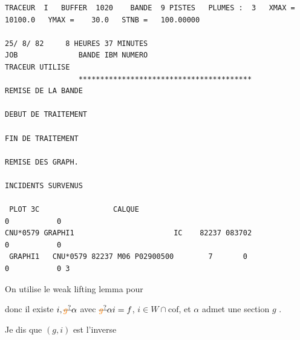 
{\fontsize{4}{5}\selectfont
\begin{verbatim}
TRACEUR  I   BUFFER  1020    BANDE  9 PISTES   PLUMES :  3   XMAX =    10100.0   YMAX =    30.0   STNB =   100.00000
                                                                    25/ 8/ 82     8 HEURES 37 MINUTES
JOB              BANDE IBM NUMERO                                   TRACEUR UTILISE
                 ****************************************           REMISE DE LA BANDE
                                                                    DEBUT DE TRAITEMENT
                                                                    FIN DE TRAITEMENT
                                                                    REMISE DES GRAPH.
                                                                    INCIDENTS SURVENUS

 PLOT 3C                 CALQUE                                              0           0
CNU*0579 GRAPHI1                       IC    82237 083702                    0           0
 GRAPHI1   CNU*0579 82237 M06 P02900500        7       0                     0           0 3
\end{verbatim}
}


On utilise le weak lifting lemma pour



donc il existe $i,\deleted{\unsure{g}}\alpha$ avec $\deleted{\unsure{g}}\alpha i=f$,  $i\in W\cap\mathrm{cof}$, et $\alpha$ admet une section $g$ .

Je dis que $(g,i)$ est l'inverse   

